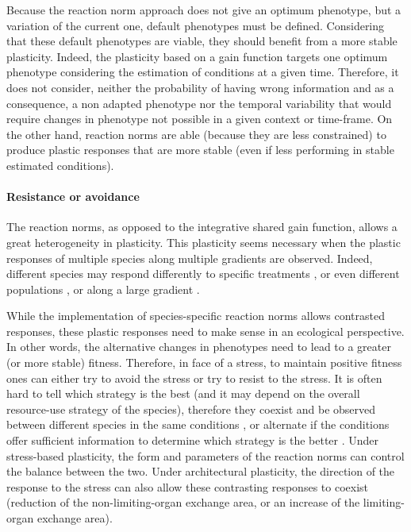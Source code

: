 Because the reaction norm approach does not give an optimum phenotype, but a variation of the current one, default phenotypes must be defined. Considering that these default phenotypes are viable, they should benefit from a more stable plasticity. Indeed, the plasticity based on a gain function targets one optimum phenotype considering the estimation of conditions at a given time. Therefore, it does not consider, neither the probability of having wrong information and as a consequence, a non adapted phenotype nor the temporal variability that would require changes in phenotype not possible in a given context or time-frame. On the other hand, reaction norms are able (because they are less constrained) to produce plastic responses that are more stable (even if less performing in stable estimated conditions).


\paragraph{Resistance or avoidance}

The reaction norms, as opposed to the integrative shared gain function, allows a great heterogeneity in plasticity. This plasticity seems necessary when the plastic responses of multiple species along multiple gradients are observed. Indeed, different species may respond differently to specific treatments \parencite{ grassein_plant_2010, freschet_plasticity_2013}, or even different populations \parencite{frei_plastic_2014}, or along a large gradient \parencite{kichenin_contrasting_2013}.

While the implementation of species-specific reaction norms allows contrasted responses, these plastic responses need to make sense in an ecological perspective. In other words, the alternative changes in phenotypes need to lead to a greater (or more stable) fitness. Therefore, in face of a stress, to maintain positive fitness ones can either try to avoid the stress or try to resist to the stress. It is often hard to tell which strategy is the best (and it may depend on the overall resource-use strategy of the species), therefore they coexist and be observed between different species in the same conditions \cite{perez-ramos_tradeoffs_2013}, or alternate if the conditions offer sufficient information to determine which strategy is the better \cite{heger_light_2016}. Under stress-based plasticity, the form and parameters of the reaction norms can control the balance between the two. Under architectural plasticity, the direction of the response to the stress can also allow these contrasting responses to coexist (reduction of the non-limiting-organ exchange area, or an increase of the limiting-organ exchange area).

